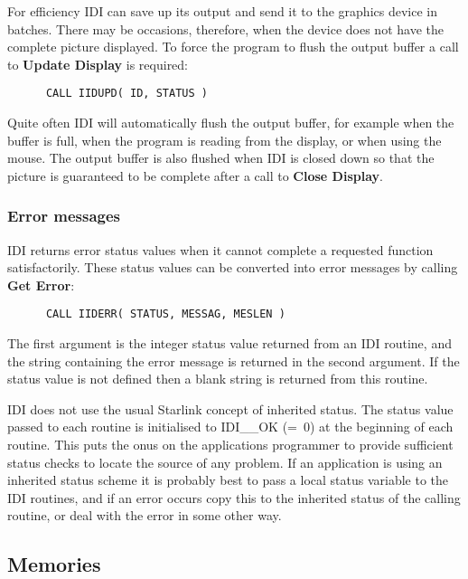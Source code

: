 For efficiency IDI can save up its output and send it to the graphics
device in batches. There may be occasions, therefore, when the device does
not have the complete picture displayed. To force the program to flush the
output buffer a call to {\bf Update Display} is required:
\begin{small}
\begin{verbatim}
      CALL IIDUPD( ID, STATUS )
\end{verbatim}
\end{small}

Quite often IDI will automatically flush the output buffer, for example
when the buffer is full, when the program is reading from the display,
or when using the mouse. The output buffer is also flushed when IDI is closed
down so that the picture is guaranteed to be complete after a call to
{\bf Close Display}.

\subsubsection{Error messages}

IDI returns error status values when it cannot complete a requested
function satisfactorily. These status values can be converted into
error messages by calling {\bf Get Error}:
\begin{small}
\begin{verbatim}
      CALL IIDERR( STATUS, MESSAG, MESLEN )
\end{verbatim}
\end{small}
The first argument is the integer status value returned from an IDI
routine, and the string containing the error message is returned in
the second argument. If the status value is not defined then a blank
string is returned from this routine.

IDI does not use the usual Starlink concept of inherited status. The
status value passed to each routine is initialised to IDI\_\_OK (=~0)
at the beginning of each routine. This puts the onus on the applications
programmer to provide sufficient status checks to locate the source of
any problem. If an application is using an
inherited status scheme it is probably best to pass a local status
variable to the IDI routines, and if an error occurs copy this to the
inherited status of the calling routine, or deal with the error in some
other way.

\subsection{Memories}


